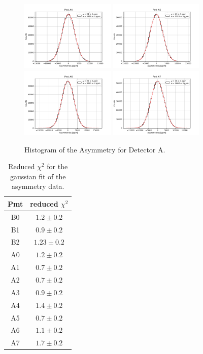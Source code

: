 \begin{figure}[!h]
\centering
\includegraphics[width = 0.40\textwidth]{Analysis/Histogram/A4.pdf}
\includegraphics[width = 0.40\textwidth]{Analysis/Histogram/A5.pdf}\\
\includegraphics[width = 0.40\textwidth]{Analysis/Histogram/A6.pdf}
\includegraphics[width = 0.40\textwidth]{Analysis/Histogram/A7.pdf}
\caption{Histogram of the Asymmetry for Detector A.}
\end{figure}

\begin{table}[!h]
\centering
\begin{tabular}{c|c}
\hline 
Pmt & reduced $\chi^{2}$ \\ 
\hline
B0 & $1.2 \pm 0.2$ \\ 
B1 & $0.9 \pm 0.2$ \\ 
B2 & $1.23 \pm 0.2$ \\
A0 & $1.2 \pm 0.2$ \\ 
A1 & $0.7 \pm 0.2$ \\ 
A2 & $0.7 \pm 0.2$ \\ 
A3 & $0.9 \pm 0.2$ \\ 
A4 & $1.4 \pm 0.2$ \\ 
A5 & $0.7 \pm 0.2$ \\ 
A6 & $1.1 \pm 0.2$ \\ 
A7 & $1.7 \pm 0.2$ \\ 
\hline 
\end{tabular}
\caption{Reduced $\chi^{2}$ for the gaussian fit of the asymmetry data.} 
\label{tab:Chisq}
\end{table}


